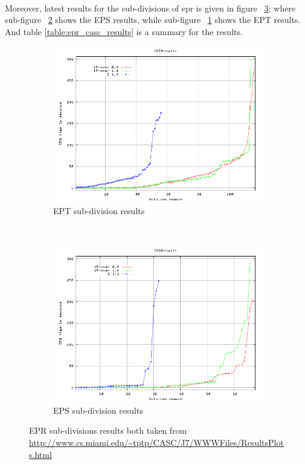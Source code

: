 \paragraph{}
Moreover, latest results for the sub-divisions of \ac{epr} is given in figure ~\ref{fig:epr_divisions_casc_results}; where sub-figure ~\ref{fig:eps_casc_results} shows the EPS results, while sub-figure ~\ref{fig:ept_casc_results} shows the EPT results. And table \ref{table:epr_casc_results} is a summary for the results.

\begin{figure}[H]
    \centering
    \begin{subfigure}[H]{\textwidth}
        \centering
        \includegraphics[scale=0.5]{pictures/EPTResults-Proof-Time.png}
        \caption{EPT sub-division results \label{fig:ept_casc_results}}
    \end{subfigure}
    ~ 
    \begin{subfigure}[H]{\textwidth}
        \centering
        \includegraphics[scale=0.5]{pictures/EPSResults-Proof-Time.png}
        \caption{EPS sub-division results \label{fig:eps_casc_results}}
    \end{subfigure}
    \caption{EPR sub-divisions results both taken from \url{http://www.cs.miami.edu/~tptp/CASC/J7/WWWFiles/ResultsPlots.html} \label{fig:epr_divisions_casc_results}}
\end{figure}


